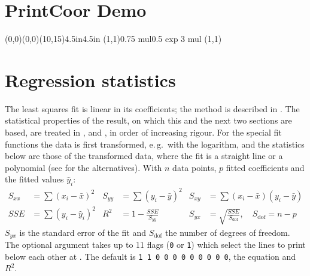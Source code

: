 \documentclass[11pt,english,BCOR10mm,DIV12,bibliography=totoc,parskip=false,
   smallheadings, headexclude,footexclude,oneside]{pst-doc}
\let\Section\section
\def\section{\clearpage\Section}
\begin{document}
\section{PrintCoor Demo}
\begin{LTXexample}[pos=t]
\begin{psgraph}[arrows=->,Dx=1,Dy=1,xsubticks=1,ysubticks=1](0,0)(0,0)(10,15){4.5in}{4.5in}
\pstScalePoints(1,1){0.75 mul}{0.5 exp 3 mul}
\listplot[plotstyle=PrintCoor,plotNoMax=1,plotNo=1,PstDebug=0,relxerr=0,relyerr=0.1]{\Linear}
\listplot[plotstyle=dots,plotNoMax=1,plotNo=1]{\Linear}
\pstScalePoints(1,1){}{}
\end{psgraph}
\end{LTXexample}

\section{Regression statistics}
The least squares fit is linear in its coefficients; the method is described
in \cite{chapra98}. The statistical properties of the result, on which this
and the next two sections are based, are treated in \cite{dunn10},
\cite{devore99} and \cite{draper98}, in order of increasing rigour.
For the special fit
functions the data is first transformed, e.\,g.\ with the logarithm, and the
statistics below are those of the transformed data, where the fit is a straight
line or a polynomial (see  for the alternatives).
With $n$ data points, $p$ fitted coefficients and the fitted values $\hat y_i$:
\begin{align*}
S_{xx} &= \sum (x_i-\bar x)^2 &
S_{yy} &= \sum (y_i-\bar y)^2 &
S_{xy} &= \sum (x_i-\bar x)(y_i-\bar y)\\
\mathit{SSE} &= \sum (y_i-\hat y_i)^2 &
R^2 &= 1-\frac{\mathit{SSE}}{S_{yy}} &
S_{yx} &= \sqrt{\frac{\mathit{SSE}}{S_{\mathrm{dof}}}},\quad S_{\mathrm{dof}}=n-p
\end{align*}
$S_{yx}$ is the standard error of the fit and $S_{\mathrm{dof}}$ the number of
degrees of freedom. The optional argument  takes up to 11 flags
(\texttt{0} or \texttt{1}) which select the lines to print below each other at
. The default is \texttt{1 1 0 0 0 0 0 0 0 0 0}, the equation
and $R^2$.
\end{document}
